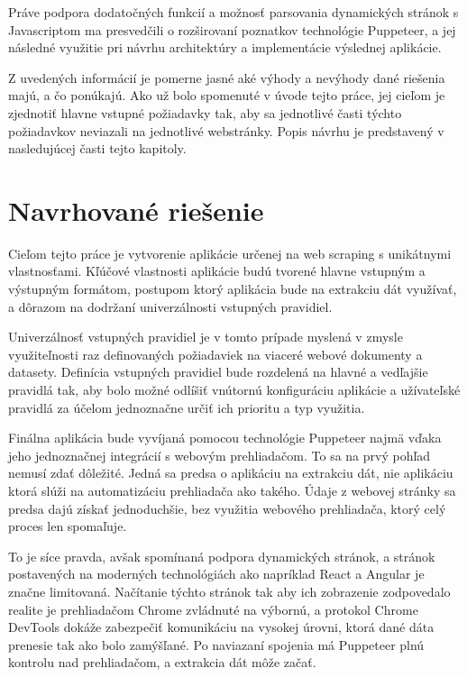 Práve podpora dodatočných funkcií a možnosť parsovania dynamických stránok s Javascriptom ma presvedčili o rozširovaní poznatkov technológie Puppeteer, a jej následné využitie pri návrhu architektúry a implementácie výslednej aplikácie. 

\bigskip

Z uvedených informácií je pomerne jasné aké výhody a nevýhody dané riešenia majú, a čo ponúkajú. Ako už bolo spomenuté v úvode tejto práce, jej cieľom je zjednotiť hlavne vstupné požiadavky tak, aby sa jednotlivé časti týchto požiadavkov neviazali na jednotlivé webstránky. Popis návrhu je predstavený v nasledujúcej časti tejto kapitoly.

\newpage

\section{Navrhované riešenie}

Cieľom tejto práce je vytvorenie aplikácie určenej na web scraping s unikátnymi vlastnosťami. Kľúčové vlastnosti aplikácie budú tvorené hlavne vstupným a výstupným formátom, postupom ktorý aplikácia bude na extrakciu dát využívať, a dôrazom na dodržaní univerzálnosti vstupných pravidiel. 

Univerzálnosť vstupných pravidiel je v tomto prípade myslená v zmysle využiteľnosti raz definovaných požiadaviek na viaceré webové dokumenty a datasety. Definícia vstupných pravidiel bude rozdelená na hlavné a vedľajšie pravidlá tak, aby bolo možné odlíšiť vnútornú konfiguráciu aplikácie a užívateľské pravidlá za účelom jednoznačne určiť ich prioritu a typ využitia.

Finálna aplikácia bude vyvíjaná pomocou technológie Puppeteer najmä vďaka jeho jednoznačnej integrácií s webovým prehliadačom. To sa na prvý pohľad nemusí zdať dôležité. Jedná sa predsa o aplikáciu na extrakciu dát, nie aplikáciu ktorá slúži na automatizáciu prehliadača ako takého. Údaje z webovej stránky sa predsa dajú získať jednoduchšie, bez využitia webového prehliadača, ktorý celý proces len spomaľuje. 

To je síce pravda, avšak spomínaná podpora dynamických stránok, a stránok postavených na moderných technológiách ako napríklad React a Angular je značne limitovaná. Načítanie týchto stránok tak aby ich zobrazenie zodpovedalo realite je prehliadačom Chrome zvládnuté na výbornú, a protokol Chrome DevTools dokáže zabezpečiť komunikáciu na vysokej úrovni, ktorá dané dáta prenesie tak ako bolo zamýšľané. Po naviazaní spojenia má Puppeteer plnú kontrolu nad prehliadačom, a extrakcia dát môže začať. 

